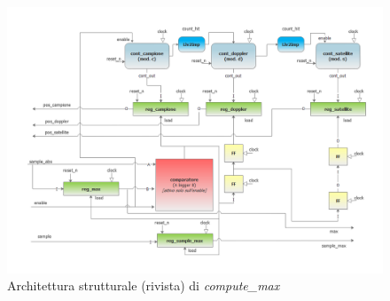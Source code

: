 \documentclass[12pt,a4paper,twoside,openany]{book}
\begin{document}
\begin{figure}
\includegraphics[scale=0.55, keepaspectratio]{immagini/computemax_schemablocchi2}
\caption{Architettura strutturale (rivista) di \textit{compute\_max}}
\label{computemax_schema2}
\end{figure}
\end{document}
